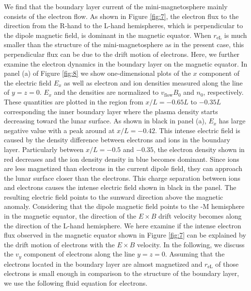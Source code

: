 \documentclass[draft,jgrga]{agutex2015}
\begin{document}
\begin{article}
We find that the boundary layer current of the mini-magnetosphere 
mainly consists of the electron flow. 
As shown in Figure \ref{fig:7}, 
the electron flux to the direction from the R-hand to the L-hand hemispheres, 
which is perpendicular to the dipole magnetic field, 
is dominant in the magnetic equator.
When $r_\mathrm{eL}$ is much smaller than the structure of the
mini-magnetosphere as in the present case,
this perpendicular flux can be due to the drift motion of electrons.
Here, we further examine the electron dynamics in the boundary layer on the magnetic equator.
In panel (a) of Figure \ref{fig:8} 
we show one-dimensional plots of the $x$ component of 
the electric field $E_x$ as well as
electron and ion densities measured along the line of $y=z=0$. 
$E_x$ and the densities are normalized to 
$v_\mathrm{flow} B_\mathrm{0}$ and $n_\mathrm{0}$, respectively.
These quantities are plotted in the region from $x/L = -0.65L$ to $-0.35L$
corresponding the inner boundary layer
where the plasma density starts decreasing toward the lunar surface.
As shown in black in panel (a), 
$E_x$ has large negative value with 
a peak around at  $x/L = -0.42 $.
This intense electric field is caused by the density difference 
between electrons and ions in the boundary layer.
Particularly between $x/L = -0.5$  and $-0.35$, 
the electron density shown in red decreases and 
the ion density density in blue becomes dominant.
Since ions are less magnetized than electrons in the current dipole field, 
they can approach the lunar surface closer than the electrons.
This charge separation between ions and electrons
causes the intense electric field shown in black in the panel.
The resulting electric field points to the sunward direction
above the magnetic anomaly.
Considering that the dipole magnetic field points
to the -M hemisphere in the magnetic equator,
the direction of the $E \times B$ drift velocity becomes 
along the direction of the L-hand hemisphere. 
We here examine if the intense electron flux observed in the magnetic equator
shown in Figure \ref{fig:7} can be explained by the drift motion of electrons
with the $E \times B$ velocity. 
In the following, 
we discuss the $v_y$ component of electrons along the line $y=z=0$.
Assuming that the electrons located in the boundary layer 
are almost magnetized and 
$r_\mathrm{eL}$ of those electrons is small enough in comparison 
to the structure of the boundary layer, 
we use the following fluid equation for electrons.
 

\end{article}
\end{document}
